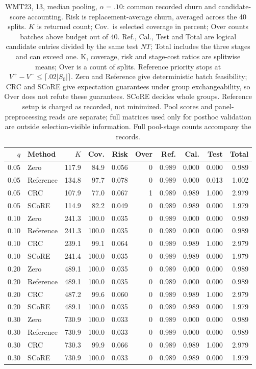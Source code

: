 \begin{table}[t]
\centering\small
\setlength{\tabcolsep}{4pt}
\begin{tabular}{rlrrrrrrrr}
\toprule
$q$ & Method & $K$ & Cov. & Risk & Over & Ref. & Cal. & Test & Total \\
\midrule
0.05 & Zero & 117.9 & 84.9 & 0.056 & 0 & 0.989 & 0.000 & 0.000 & 0.989 \\
0.05 & Reference & 134.8 & 97.7 & 0.078 & 0 & 0.989 & 0.000 & 0.013 & 1.002 \\
0.05 & CRC & 107.9 & 77.0 & 0.067 & 1 & 0.989 & 0.989 & 1.000 & 2.979 \\
0.05 & SCoRE & 114.9 & 82.2 & 0.049 & 0 & 0.989 & 0.989 & 0.000 & 1.979 \\
0.10 & Zero & 241.3 & 100.0 & 0.035 & 0 & 0.989 & 0.000 & 0.000 & 0.989 \\
0.10 & Reference & 241.3 & 100.0 & 0.035 & 0 & 0.989 & 0.000 & 0.000 & 0.989 \\
0.10 & CRC & 239.1 & 99.1 & 0.064 & 0 & 0.989 & 0.989 & 1.000 & 2.979 \\
0.10 & SCoRE & 241.4 & 100.0 & 0.035 & 0 & 0.989 & 0.989 & 0.000 & 1.979 \\
0.20 & Zero & 489.1 & 100.0 & 0.035 & 0 & 0.989 & 0.000 & 0.000 & 0.989 \\
0.20 & Reference & 489.1 & 100.0 & 0.035 & 0 & 0.989 & 0.000 & 0.000 & 0.989 \\
0.20 & CRC & 487.2 & 99.6 & 0.060 & 0 & 0.989 & 0.989 & 1.000 & 2.979 \\
0.20 & SCoRE & 489.1 & 100.0 & 0.035 & 0 & 0.989 & 0.989 & 0.000 & 1.979 \\
0.30 & Zero & 730.9 & 100.0 & 0.033 & 0 & 0.989 & 0.000 & 0.000 & 0.989 \\
0.30 & Reference & 730.9 & 100.0 & 0.033 & 0 & 0.989 & 0.000 & 0.000 & 0.989 \\
0.30 & CRC & 730.3 & 99.9 & 0.066 & 0 & 0.989 & 0.989 & 1.000 & 2.979 \\
0.30 & SCoRE & 730.9 & 100.0 & 0.033 & 0 & 0.989 & 0.989 & 0.000 & 1.979 \\
\bottomrule
\end{tabular}
\caption{WMT23, 13, median pooling, $\alpha=.10$: common recorded churn and candidate-score accounting. Risk is replacement-average churn, averaged across the 40 splits. $K$ is returned count; Cov.\ is selected coverage in percent; Over counts batches above budget out of 40. Ref., Cal., Test and Total are logical candidate entries divided by the same test $NT$; Total includes the three stages and can exceed one. K, coverage, risk and stage-cost ratios are splitwise means; Over is a count of splits. Reference priority stops at $V^+-V^-\le\lceil.02|S_0|\rceil$. Zero and Reference give deterministic batch feasibility; CRC and SCoRE give expectation guarantees under group exchangeability, so Over does not refute these guarantees. SCoRE decides whole groups. Reference setup is charged as recorded, not minimized. Pool scores and panel-preprocessing reads are separate; full matrices used only for posthoc validation are outside selection-visible information. Full pool-stage counts accompany the records.}
\label{tab:common-WMT23-median}
\end{table}
